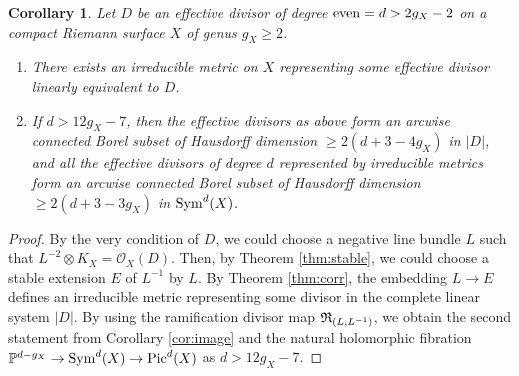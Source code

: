 \documentclass[12pt]{article}
\newtheorem{cor}{Corollary}[section]
\begin{document}
\begin{cor}
\label{cor:irr}
Let $D$ be an effective divisor of degree ${\rm even}=d>2g_X-2$ on a compact Riemann surface $X$ of genus $g_X\geq 2$.
\begin{enumerate}

\item There exists an irreducible metric on $X$ representing some effective divisor linearly equivalent to $D$.

\item If $d> 12g_{X} - 7$, then the effective divisors as above form an arcwise connected Borel subset of Hausdorff dimension $\geq 2(d+3-4g_X)$ in $|D|$, and all the effective divisors of degree $d$ represented by irreducible metrics form an arcwise connected Borel subset of Hausdorff dimension $\geq 2(d+3-3g_X)$ in ${\rm Sym}^d(X)$.
\end{enumerate}
\end{cor}
\begin{proof} By the very condition of $D$, we could choose a negative line bundle $L$ such that $L^{-2} \otimes K_{X} = \mathcal{O}_{X}(D)$. Then, by Theorem \ref{thm:stable}, we could choose a stable extension $E$ of $L^{-1}$ by $L$. By Theorem \ref{thm:corr}, the embedding $L \to E$ defines an irreducible metric representing some divisor in the complete linear system $|D|$.  By using the ramification divisor map ${\frak R}_{(L,L^{-1})}$, we obtain the second statement from Corollary \ref{cor:image} and the natural holomorphic fibration
${\Bbb P}^{d-g_X}\to \operatorname{Sym}^{d}(X)\to {\rm Pic}^{d}(X)$
as $d > 12g_{X} - 7$.
\end{proof}







\end{document}

